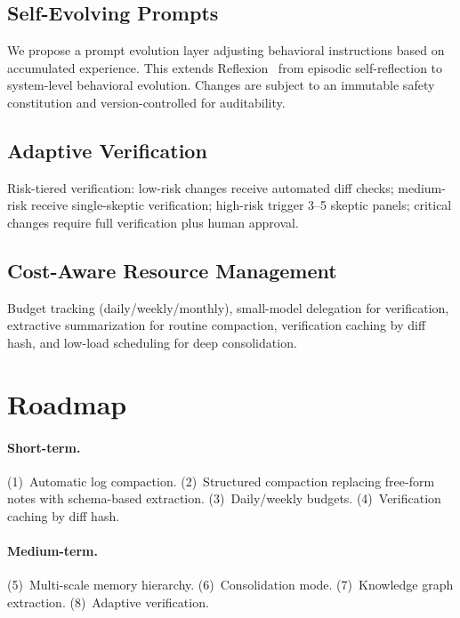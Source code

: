 \documentclass{article}
\begin{document}
\subsection{Self-Evolving Prompts}
\label{sec:prompts}

We propose a prompt evolution layer adjusting behavioral instructions based on accumulated experience. This extends Reflexion~\cite{shinn2023reflexion} from episodic self-reflection to system-level behavioral evolution. Changes are subject to an immutable safety constitution and version-controlled for auditability.

\subsection{Adaptive Verification}

Risk-tiered verification: low-risk changes receive automated diff checks; medium-risk receive single-skeptic verification; high-risk trigger 3--5 skeptic panels; critical changes require full verification plus human approval.

\subsection{Cost-Aware Resource Management}

Budget tracking (daily/weekly/monthly), small-model delegation for verification, extractive summarization for routine compaction, verification caching by diff hash, and low-load scheduling for deep consolidation.

\section{Roadmap}
\label{sec:roadmap}

\paragraph{Short-term.} (1)~Automatic log compaction. (2)~Structured compaction replacing free-form notes with schema-based extraction. (3)~Daily/weekly budgets. (4)~Verification caching by diff hash.

\paragraph{Medium-term.} (5)~Multi-scale memory hierarchy. (6)~Consolidation mode. (7)~Knowledge graph extraction. (8)~Adaptive verification.
\end{document}
